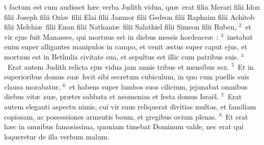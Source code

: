 \bchapter
{}t factum est cum audisset h\ae c verba Judith vidua, qu\ae\ erat filia Merari filii Idox filii Joseph filii Ozi\ae\ filii Elai filii Jamnor filii Gedeon filii Raphaim filii Achitob filii Melchi\ae\ filii Enan filii Nathani\ae\ filii Salathiel filii Simeon filii Ruben,
${}^{2}$~et vir ejus fuit Manasses, qui mortuus est in diebus messis hordeace\ae~:
${}^{3}$~instabat enim super alligantes manipulos in campo, et venit \ae stus super caput ejus, et mortuus est in Bethulia civitate sua, et sepultus est illic cum patribus suis.
${}^{4}$~Erat autem Judith relicta ejus vidua jam annis tribus et mensibus sex.
${}^{5}$~Et in superioribus domus su\ae\ fecit sibi secretum cubiculum, in quo cum puellis suis clausa morabatur,
${}^{6}$~et habens super lumbos suos cilicium, jejunabat omnibus diebus vit\ae\ su\ae , pr\ae ter sabbata et neomenias et festa domus Isra\"el.
${}^{7}$~Erat autem eleganti aspectu nimis, cui vir suus reliquerat divitias multas, et familiam copiosam, ac possessiones armentis boum, et gregibus ovium plenas.
${}^{8}$~Et erat h\ae c in omnibus famosissima, quoniam timebat Dominum valde, nec erat qui loqueretur de illa verbum malum.


